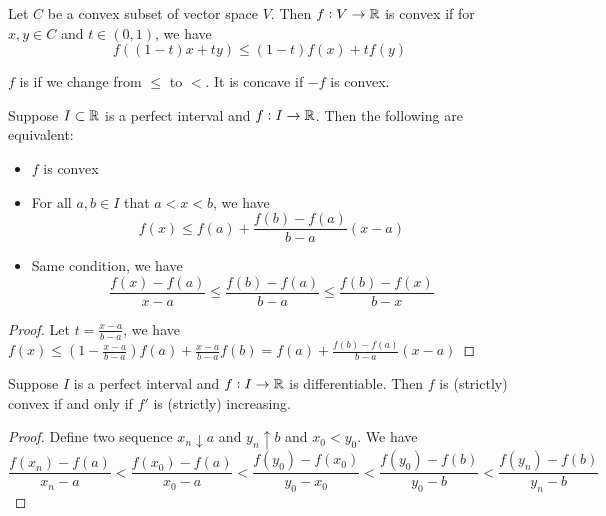 \begin{definition}
    Let $C$ be a convex subset of vector space $V$. Then $f:V \rightarrow \mathbb{R}$ is convex if for $x,y \in C$ and $t \in (0,1)$, we have
    \begin{equation}
        f\left( (1-t)x + ty \right) \leq (1-t) f(x) + t f(y)
    \end{equation}
    
    $f$ is  if we change from $\leq$ to $<$. It is concave if $-f$ is convex.
\end{definition}

\begin{theorem}
    Suppose $I \subset \mathbb{R}$ is a perfect interval and $f: I \rightarrow \mathbb{R}$. Then the following are equivalent:
    \begin{itemize}
        \item $f$ is convex
        \item For all $a,b \in I$ that $a < x < b$, we have \begin{equation}
            f(x) \leq f(a) + \frac{f(b) - f(a)}{b-a} (x-a)
        \end{equation}
        \item Same condition, we have \begin{equation}
            \frac{f(x) - f(a)}{x - a} \leq \frac{f(b) - f(a)}{b - a} \leq \frac{f(b) - f(x)}{b - x}
        \end{equation}
    \end{itemize}
\end{theorem}
\begin{proof}
    Let $t = \frac{x-a}{b-a}$, we have $f(x) \leq \left(1 - \frac{x-a}{b-a}\right)f(a) + \frac{x-a}{b-a}f(b) = f(a) + \frac{f(b) - f(a)}{b-a}(x-a) $
\end{proof}

\begin{theorem}
    Suppose $I$ is a perfect interval and $f: I \rightarrow \mathbb{R}$ is differentiable. Then $f$ is (strictly) convex if and only if $f'$ is (strictly) increasing.
\end{theorem}
\begin{proof}
    Define two sequence $x_n \downarrow a$ and $y_n \uparrow b$ and $x_0 < y_0$. We have
    \begin{equation}
        \frac{f(x_n) - f(a)}{x_n - a} < \frac{f(x_0) - f(a)}{x_0 - a} < \frac{f(y_0) - f(x_0)}{y_0 - x_0} < \frac{f(y_0) - f(b)}{y_0 - b} < \frac{f(y_n) - f(b)}{y_n - b}
    \end{equation}
\end{proof}




